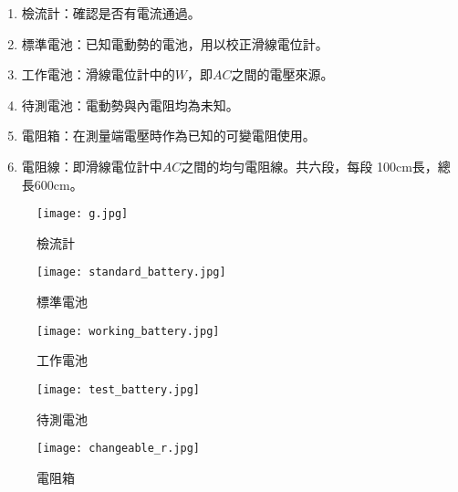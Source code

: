 \documentclass[12pt]{article}
\begin{document}
        \begin{enumerate}[label={\Alph*. }, leftmargin=2\parindent]
                \item 檢流計：確認是否有電流通過。
                \item 標準電池：已知電動勢的電池，用以校正滑線電位計。
                \item 工作電池：滑線電位計中的$W$，即$AC$之間的電壓來源。
                \item 待測電池：電動勢與內電阻均為未知。
                \item 電阻箱：在測量端電壓時作為已知的可變電阻使用。
                \item 電阻線：即滑線電位計中$AC$之間的均勻電阻線。共六段，每段
                    100cm長，總長600cm。
            \end{enumerate}
            
            \begin{figure}[h]
                \begin{minipage}{0.27\textwidth}
                \centering
                \texttt{[image: g.jpg]}
                \caption{檢流計}
                \label{fig:g}
                \end{minipage}
                \begin{minipage}{0.36\textwidth}
                \centering
                \texttt{[image: standard\_battery.jpg]}
                \caption{標準電池}
                \label{fig:standard_battery}
                \end{minipage}
                \begin{minipage}{0.36\textwidth}
                \centering
                \texttt{[image: working\_battery.jpg]}
                \caption{工作電池}
                \label{fig:working_battery}
                \end{minipage}
            \end{figure}
            \begin{figure}[h]
                \begin{minipage}{0.42\textwidth}
                \centering
                \texttt{[image: test\_battery.jpg]}
                \caption{待測電池}
                \label{fig:test_battery}
                \end{minipage}
                \begin{minipage}{0.57\textwidth}
                \centering
                \texttt{[image: changeable\_r.jpg]}
                \caption{電阻箱}
                \label{fig:changeable_r}
                \end{minipage}
            \end{figure}
\end{document}
